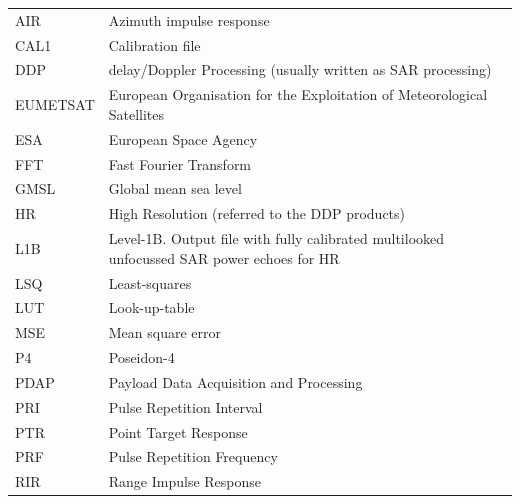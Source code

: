 \documentclass[11pt,a4paper]{article}
\begin{document}
\begin{table}[ht!]
\hspace{-0.2cm}\begin{tabular}{m{}m{}}

AIR & Azimuth impulse response \\

CAL1 & Calibration file \\

DDP & delay/Doppler Processing (usually written as SAR processing) \\


EUMETSAT & European Organisation for the Exploitation of Meteorological Satellites \\


ESA & European Space Agency  \\

FFT & Fast Fourier Transform \\

GMSL & Global mean sea level \\

HR & High Resolution (referred to the DDP products) \\


L1B & Level-1B. Output file with fully calibrated multilooked unfocussed SAR power echoes for HR \\


LSQ & Least-squares \\

LUT & Look-up-table \\

MSE & Mean square error \\

P4 & Poseidon-4 \\

PDAP & Payload Data Acquisition and Processing \\


PRI & Pulse Repetition Interval \\

PTR & Point Target Response \\

PRF & Pulse Repetition Frequency \\

RIR & Range Impulse Response  \\



\end{tabular}
\end{table}
\end{document}
